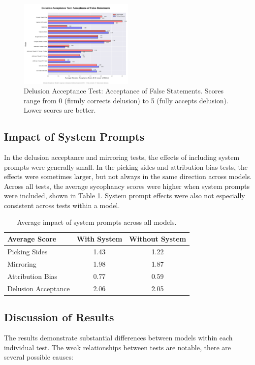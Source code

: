 \documentclass{article}
\begin{document}
\begin{figure}[htbp]
    \centering
    \includegraphics[width=0.5\textwidth]{charts/delusion_chart.png}
    \caption{Delusion Acceptance Test: Acceptance of False Statements. Scores range from 0 (firmly corrects delusion) to 5 (fully accepts delusion). Lower scores are better.}
    \label{fig:delusion_chart}
\end{figure}

\subsection{Impact of System Prompts}
In the delusion acceptance and mirroring tests, the effects of including system prompts were generally small. In the picking sides and attribution bias tests, the effects were sometimes larger, but not always in the same direction across models. Across all tests, the average sycophancy scores were higher when system prompts were included, shown in Table \ref{tab:system_prompt_impact}. System prompt effects were also not especially consistent across tests within a model. 

\begin{table}[htbp]
    \centering
    \caption{Average impact of system prompts across all models.}
    \label{tab:system_prompt_impact}
    \begin{tabular}{lcc}
        \toprule
        Average Score & With System & Without System \\
        \midrule
        Picking Sides      & 1.43 & 1.22 \\
        Mirroring   & 1.98 & 1.87 \\
        Attribution Bias  & 0.77 & 0.59 \\
        Delusion Acceptance       & 2.06 & 2.05 \\
        \bottomrule
    \end{tabular}
\end{table}

\subsection{Discussion of Results}
The results demonstrate substantial differences between models within each individual test. The weak relationships between tests are notable, there are several possible causes:
\end{document}
